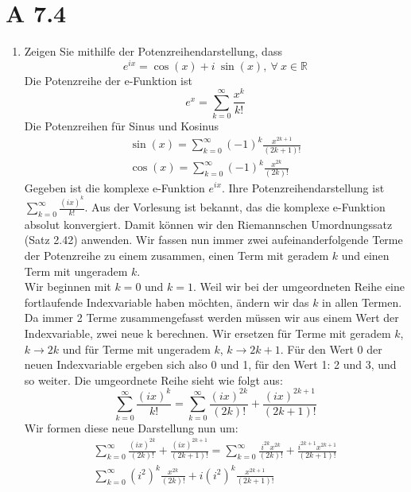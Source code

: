 \documentclass{article}
\begin{document}
    \section*{A 7.4}
    \begin{enumerate}[label = (\alph*) ]
        \item Zeigen Sie mithilfe der Potenzreihendarstellung, dass
        \[ e^{ix} = \cos(x) + i \ \sin(x), \ \forall \ x \in \mathbb{R} \]
        Die Potenzreihe der e-Funktion ist
        \[e^{x} = \sum_{k=0}^{\infty} \frac{x^k}{k!}\]
        Die Potenzreihen für Sinus und Kosinus
        \begin{gather*}
            \sin(x) = \sum_{k=0}^{\infty} {(-1)}^k \frac{x^{2k+1}}{(2k+1)!} \\
            \cos(x) = \sum_{k=0}^{\infty} {(-1)}^k \frac{x^{2k}}{(2k)!}
        \end{gather*}
        Gegeben ist die komplexe e-Funktion \(e^{ix}\). Ihre Potenzreihendarstellung ist \(\sum_{k=0}^{\infty} \frac{{(ix)}^k}{k!}\).
        Aus der Vorlesung ist bekannt, das die komplexe e-Funktion absolut konvergiert. Damit können wir den Riemannschen Umordnungssatz (Satz 2.42) anwenden.
        Wir fassen nun immer zwei aufeinanderfolgende Terme der Potenzreihe zu einem zusammen, einen Term mit geradem \(k\) und einen Term mit ungeradem \(k\). \\
        Wir beginnen mit \( k=0 \) und \( k=1 \). Weil wir bei der umgeordneten Reihe eine fortlaufende Indexvariable haben möchten,
        ändern wir das \(k\) in allen Termen. Da immer 2 Terme zusammengefasst werden müssen wir aus einem Wert der Indexvariable, zwei neue k berechnen.
        Wir ersetzen für Terme mit geradem \(k\), \(k \to 2k\) und für Terme mit ungeradem \(k\), \(k \to 2k + 1\).
        Für den Wert 0 der neuen Indexvariable ergeben sich also 0 und 1, für den Wert 1: 2 und 3, und so weiter.
        Die umgeordnete Reihe sieht wie folgt aus: 
        \[ \sum_{k=0}^{\infty} \frac{{(ix)}^k}{k!} = \sum_{k=0}^{\infty} \frac{{(ix)}^{2k}}{(2k)!} + \frac{{(ix)}^{2k+1}}{(2k+1)!} \]
        Wir formen diese neue Darstellung nun um:
        \begin{gather*}
            \sum_{k=0}^{\infty} \frac{{(ix)}^{2k}}{(2k)!} + \frac{{(ix)}^{2k+1}}{(2k+1)!} = \sum_{k=0}^{\infty} \frac{ {i}^{2k} {x}^{2k}} {(2k)!} + \frac{ {i}^{2k+1} {x}^{2k+1} }{(2k+1)!} \\
            \sum_{k=0}^{\infty} {(i^2)}^{k} \frac{ {x}^{2k}} {(2k)!} + i{(i^2)}^{k} \frac{ {x}^{2k+1} }{(2k+1)!}
        \end{gather*}

\end{enumerate}
\end{document}
